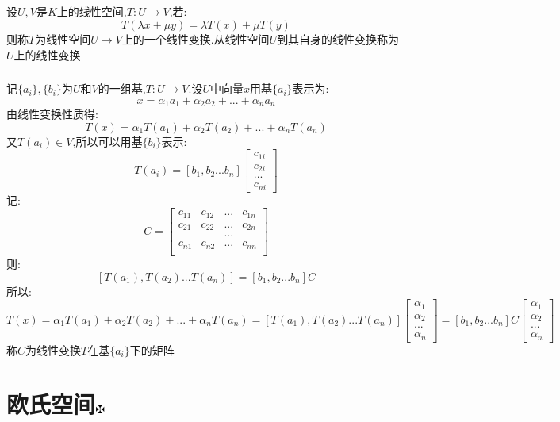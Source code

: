 \documentclass[11pt, a4paper, UTF8]{ctexart}
\begin{document}
\subsection{}
设$U,V$是$K$上的线性空间,$T:U\to V$,若:\\
\[T(\lambda x+\mu y)=\lambda T(x)+\mu T(y)\]
则称$T$为线性空间$U\to V$上的一个线性变换.从线性空间$U$到其自身的线性变换称为$U$上的线性变换\\
\subsubsection{}
记$\{a_i\},\{b_i\}$为$U$和$V$的一组基,$T:U\to V$.设$U$中向量$x$用基$\{a_i\}$表示为:\\
\[x=\alpha_1a_1+\alpha_2a_2+...+\alpha_na_n\]
由线性变换性质得:\\
\[T(x)=\alpha_1T(a_1)+\alpha_2T(a_2)+...+\alpha_nT(a_n)\]
又$T(a_i)\in V$,所以可以用基$\{b_i\}$表示:\\
\[T(a_i)=[b_1,b_2...b_n]\begin{bmatrix}
c_{1i}\\
c_{2i}\\
...\\
c_{ni}
\end{bmatrix}\]
记:\\
\[C=\begin{bmatrix}
c_{11}&c_{12}&...&c_{1n}\\
c_{21}&c_{22}&...&c_{2n}\\
&&...\\
c_{n1}&c_{n2}&...&c_{nn}\\
\end{bmatrix}\]
则:\\
\[[T(a_1),T(a_2)...T(a_n)]=[b_1,b_2...b_n]C\]
所以:\\
\[T(x)=\alpha_1T(a_1)+\alpha_2T(a_2)+...+\alpha_nT(a_n)=[T(a_1),T(a_2)...T(a_n)]\begin{bmatrix}
\alpha_1\\
\alpha_2\\
...\\
\alpha_n
\end{bmatrix}
=[b_1,b_2...b_n]C
\begin{bmatrix}
\alpha_1\\
\alpha_2\\
...\\
\alpha_n
\end{bmatrix}\]
称$C$为线性变换$T$在基$\{a_i\}$下的矩阵\\
\section{欧氏空间\protect\hyperlink{catalog}{$\fuck$}}
\end{document}
